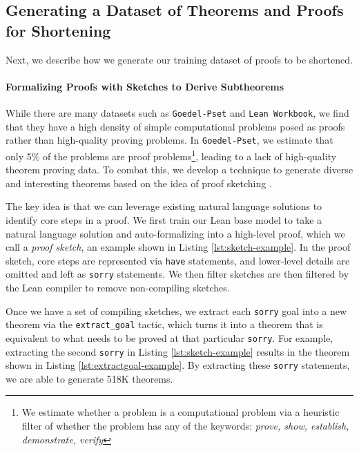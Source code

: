 \subsection{Generating a Dataset of Theorems and Proofs for Shortening} \label{subsec:proof-shortening-dataset}
Next, we describe how we generate our training dataset of proofs to be shortened.

\paragraph{Formalizing Proofs with Sketches to Derive Subtheorems} While there are many datasets such as \texttt{Goedel-Pset} and \texttt{Lean Workbook}, we find that they have a high density of simple computational problems posed as proofs rather than high-quality proving problems. In \texttt{Goedel-Pset}, we estimate that only 5\% of the problems are proof problems\footnote{We estimate whether a problem is a computational problem via a heuristic filter of whether the problem has any of the keywords: \textit{prove, show, establish, demonstrate, verify}}, leading to a lack of high-quality theorem proving data. To combat this, we develop a technique to generate diverse and interesting theorems based on the idea of proof sketching \citep{jiang2022draft}.

The key idea is that we can leverage existing natural language solutions to identify core steps in a proof. We first train our Lean base model to take a natural language solution and auto-formalizing into a high-level proof, which we call a \textit{proof sketch}, an example shown in Listing \ref{lst:sketch-example}. In the proof sketch, core steps are represented via \texttt{have} statements, and lower-level details are omitted and left as \texttt{sorry} statements. We then filter sketches are then filtered by the Lean compiler to remove non-compiling sketches.

Once we have a set of compiling sketches, we extract each \texttt{sorry} goal into a new theorem via the \texttt{extract\_goal} tactic, which turns it into a theorem that is equivalent to what needs to be proved at that particular \texttt{sorry}. For example, extracting the second \texttt{sorry} in Listing \ref{lst:sketch-example} results in the theorem shown in Listing \ref{lst:extractgoal-example}. By extracting these \texttt{sorry} statements, we are able to generate 518K theorems.

